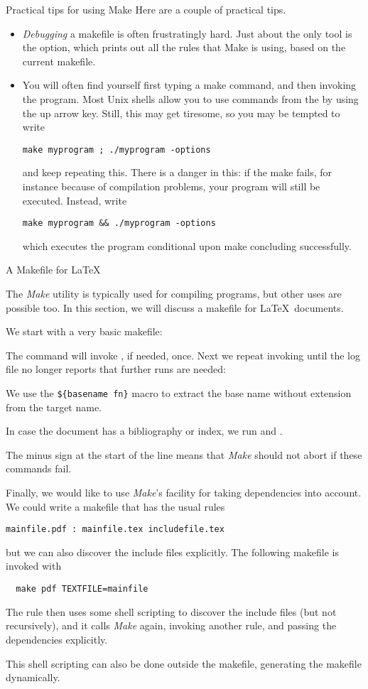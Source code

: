  {Practical tips for using Make}
Here are a couple of practical tips.

\begin{itemize}
\item \emph{Debugging} a makefile is often
  frustratingly hard.  Just about the only tool is the  option,
  which prints out all the rules that Make is using, based on the
  current makefile.
\item You will often find yourself first typing a make command, and
  then invoking the program. Most Unix shells allow you to use
  commands from the  by using the
  up arrow key. Still, this may get tiresome, so you may be tempted to
  write
\begin{verbatim}
make myprogram ; ./myprogram -options
\end{verbatim}
and keep repeating this.
There is a danger in this: if the make fails, for instance because of
compilation problems, your program will still be executed. Instead, write
\begin{verbatim}
make myprogram && ./myprogram -options
\end{verbatim}
which executes the program conditional upon make concluding successfully.
\end{itemize}

 {A Makefile for \LaTeX}
\label{sec:latex-make}

The \emph{Make} utility is typically used for compiling programs, but
other uses are possible too. In this section, we will discuss a
makefile for \LaTeX\ documents.

We start with a very basic makefile:

The command  will invoke ,
if needed, once. Next we repeat invoking  until the log file no
longer reports that further runs are needed:

We use the \verb+${basename fn}+ macro to extract the base name
without extension from the target name.

In case the document has a bibliography or index, we run 
and . 

The minus sign at the start of the line means that
\emph{Make} should not abort if these commands fail.

Finally, we would like to use \emph{Make}'s facility for taking
dependencies into account. 
We could write a makefile that has
the usual rules
\begin{verbatim}
mainfile.pdf : mainfile.tex includefile.tex
\end{verbatim}
but we can also discover the include files explicitly. The following
makefile is invoked with 
\begin{verbatim}
  make pdf TEXTFILE=mainfile
\end{verbatim}
The  rule then uses some shell scripting to discover the
include files (but not recursively), and it calls \emph{Make} again,
invoking another rule, and passing the dependencies explicitly.

This shell scripting can also be done outside the makefile, generating
the makefile dynamically.

